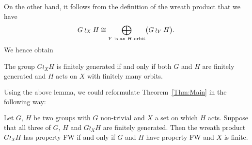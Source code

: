 On the other hand, it follows from the definition of the wreath product that we have
\[
	G\wr_XH\cong\bigoplus_{Y\textnormal{ is an $H$-orbit}}\bigl(G\wr_YH\bigr).
\]
We hence obtain
%
%
\begin{lem}
The group $G\wr_XH$ is finitely generated if and only if both $G$ and $H$ are finitely generated and $H$ acts on $X$ with finitely many orbits.
\end{lem}
%
%
Using the above lemma, we could reformulate Theorem~\ref{Thm:Main} in the following way:
%
%
\begin{prop}
Let $G$, $H$ be two groups with $G$ non-trivial and $X$ a set on which $H$ acts. Suppose that all three of $G$, $H$ and $G\wr_XH$ are finitely generated. Then the wreath product $G\wr_XH$ has property FW if and only if $G$ and $H$ have property FW and $X$ is finite.
\end{prop}